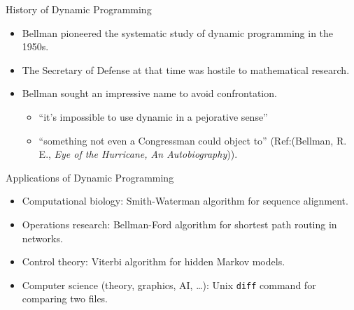    \begin{frame}[fragile]{History of Dynamic Programming}

  \begin{itemize}
  \item Bellman pioneered the systematic study of dynamic programming in
    the 1950s.  

  \item The Secretary of Defense at that time was hostile to mathematical research.
  \item Bellman sought an impressive name to avoid confrontation. 
    \begin{itemize}
    \item ``it's impossible to use dynamic in a pejorative sense''
    \item ``something not even a Congressman could object to''
      (Ref:{(Bellman, R. E., \emph{Eye of the Hurricane, An
        Autobiography})}).
    \end{itemize} 
  \end{itemize}
\end{frame}

   \begin{frame}[fragile]{Applications of Dynamic Programming}

  \begin{itemize}
  \item Computational biology: Smith-Waterman algorithm for sequence alignment.
  \item Operations research: Bellman-Ford algorithm for shortest path
    routing in networks.
  \item Control theory: Viterbi algorithm for hidden Markov models.
  \item Computer science (theory, graphics, AI, \ldots): Unix
    \texttt{diff} command for comparing two files.
  \end{itemize}
\end{frame}


